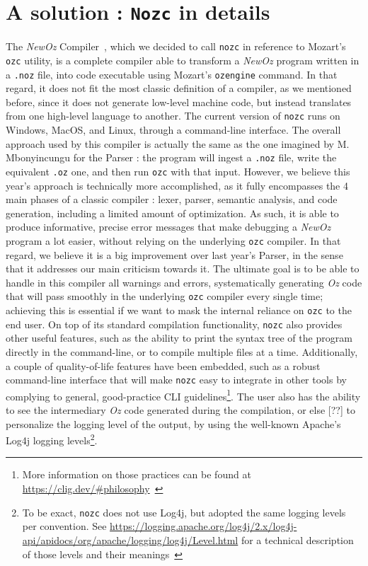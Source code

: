 \section{A solution : \texttt{Nozc} in details}\label{sec:ch3-nozc}
The \textit{NewOz} Compiler~\cite{NozcGitHub}, which we decided to call \texttt{nozc} in reference to Mozart's \texttt{ozc} utility, is a complete compiler able to transform a \textit{NewOz} program written in a \texttt{.noz} file, into code executable using Mozart's \texttt{ozengine} command.
In that regard, it does not fit the most classic definition of a compiler, as we mentioned before, since it does not generate low-level machine code, but instead translates from one high-level language to another.
The current version of \texttt{nozc} runs on Windows, MacOS, and Linux, through a command-line interface.\newline
The overall approach used by this compiler is actually the same as the one imagined by M. Mbonyincungu for the Parser : the program will ingest a \texttt{.noz} file, write the equivalent \texttt{.oz} one, and then run \texttt{ozc} with that input.
However, we believe this year's approach is technically more accomplished, as it fully encompasses the 4 main phases of a classic compiler : lexer, parser, semantic analysis, and code generation, including a limited amount of optimization.
As such, it is able to produce informative, precise error messages that make debugging a \textit{NewOz} program a lot easier, without relying on the underlying \texttt{ozc} compiler.
In that regard, we believe it is a big improvement over last year's Parser, in the sense that it addresses our main criticism towards it.
The ultimate goal is to be able to handle in this compiler all warnings and errors, systematically generating \textit{Oz} code that will pass smoothly in the underlying \texttt{ozc} compiler every single time;
achieving this is essential if we want to mask the internal reliance on \texttt{ozc} to the end user.\newline
On top of its standard compilation functionality, \texttt{nozc} also provides other useful features, such as the ability to print the syntax tree of the program directly in the command-line, or to compile multiple files at a time.
Additionally, a couple of quality-of-life features have been embedded, such as a robust command-line interface that will make \texttt{nozc} easy to integrate in other tools by complying to general, good-practice CLI guidelines\footnote{More information on those practices can be found at \url{https://clig.dev/\#philosophy}~\cite{clig}}.
The user also has the ability to see the intermediary \textit{Oz} code generated during the compilation, or else [??] to personalize the logging level of the output, by using the well-known Apache's Log4j logging levels\footnote{To be exact, \texttt{nozc} does not use Log4j, but adopted the same logging levels per convention. See \url{https://logging.apache.org/log4j/2.x/log4j-api/apidocs/org/apache/logging/log4j/Level.html} for a technical description of those levels and their meanings~\cite{log4j}}.\newline


